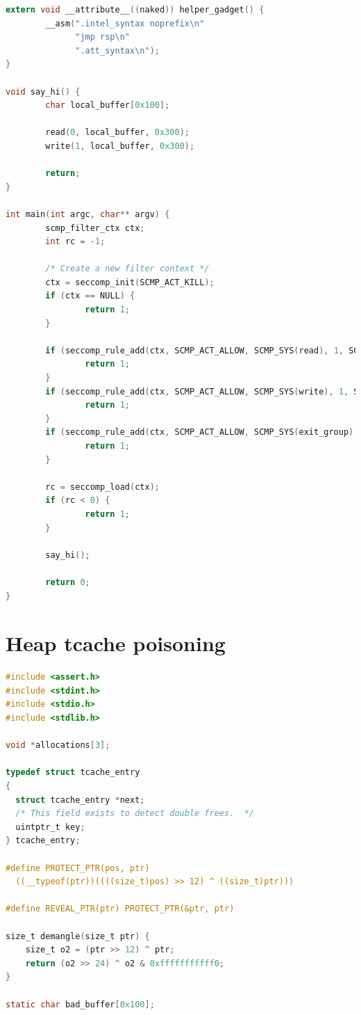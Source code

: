 \documentclass{article}
\begin{document}
\begin{appendices}
\begin{lstlisting}[language={C},label={lst:seccomp}]
extern void __attribute__((naked)) helper_gadget() {
        __asm(".intel_syntax noprefix\n"
              "jmp rsp\n"
              ".att_syntax\n");
}

void say_hi() {
        char local_buffer[0x100];

        read(0, local_buffer, 0x300);
        write(1, local_buffer, 0x300);

        return;
}

int main(int argc, char** argv) {
        scmp_filter_ctx ctx;
        int rc = -1;

        /* Create a new filter context */
        ctx = seccomp_init(SCMP_ACT_KILL);
        if (ctx == NULL) {
                return 1;
        }

        if (seccomp_rule_add(ctx, SCMP_ACT_ALLOW, SCMP_SYS(read), 1, SCMP_A0(SCMP_CMP_EQ, 0)) < 0) {
                return 1;
        }
        if (seccomp_rule_add(ctx, SCMP_ACT_ALLOW, SCMP_SYS(write), 1, SCMP_A0(SCMP_CMP_EQ, 1)) < 0) {
                return 1;
        }
        if (seccomp_rule_add(ctx, SCMP_ACT_ALLOW, SCMP_SYS(exit_group), 0) < 0) {
                return 1;
        }

        rc = seccomp_load(ctx);
        if (rc < 0) {
                return 1;
        }

        say_hi();

        return 0;
}
\end{lstlisting}
\section{Heap tcache poisoning}
\begin{lstlisting}[language={C},label={lst:tcache_poison}]
#include <assert.h>
#include <stdint.h>
#include <stdio.h>
#include <stdlib.h>

void *allocations[3];

typedef struct tcache_entry
{
  struct tcache_entry *next;
  /* This field exists to detect double frees.  */
  uintptr_t key;
} tcache_entry;

#define PROTECT_PTR(pos, ptr)                                                  \
  ((__typeof(ptr))((((size_t)pos) >> 12) ^ ((size_t)ptr)))

#define REVEAL_PTR(ptr) PROTECT_PTR(&ptr, ptr)

size_t demangle(size_t ptr) {
    size_t o2 = (ptr >> 12) ^ ptr;
    return (o2 >> 24) ^ o2 & 0xfffffffffff0;
}

static char bad_buffer[0x100];


\end{lstlisting}
\end{appendices}
\end{document}
